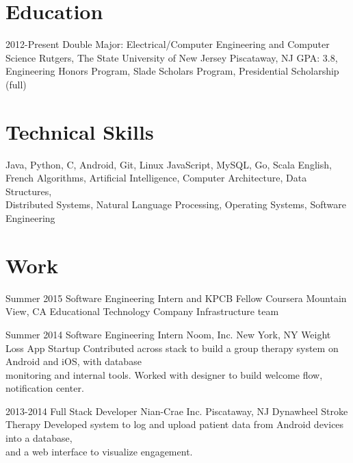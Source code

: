 \documentclass[11pt,letterpaper]{moderncv}
\begin{document}
\maketitle

\section{Education}
\cventry
    {2012-Present}
    {Double Major: Electrical/Computer Engineering and Computer Science}
    {Rutgers, The State University of New Jersey}
    {Piscataway, NJ}
    {}
    {GPA: 3.8, Engineering Honors Program, Slade Scholars Program, Presidential Scholarship (full)}

\section{Technical Skills}
       {Java, Python, C, Android, Git, Linux}
       {JavaScript, MySQL, Go, Scala}
       {English, French}
       {Algorithms, Artificial Intelligence, Computer Architecture, Data Structures,\\Distributed Systems, Natural Language Processing, Operating Systems, Software Engineering}

\section{Work}
    \cventry
        {Summer 2015}
        {Software Engineering Intern and KPCB Fellow}
        {Coursera}
        {Mountain View, CA}
        {Educational Technology Company}
        {Infrastructure team\\}

    \cventry
        {Summer 2014}
        {Software Engineering Intern}
        {Noom, Inc.}
        {New York, NY}
        {Weight Loss App Startup}
        {Contributed across stack to build a group therapy system on Android and iOS, with database\\monitoring and internal tools. Worked with designer to build welcome flow, notification center.\\}

    \cventry
        {2013-2014}
        {Full Stack Developer}
        {Nian-Crae Inc.}
        {Piscataway, NJ}
        {Dynawheel Stroke Therapy}
        {Developed system to log and upload patient data from Android devices into a database,\\and a web interface to visualize engagement.\\}
\end{document}
